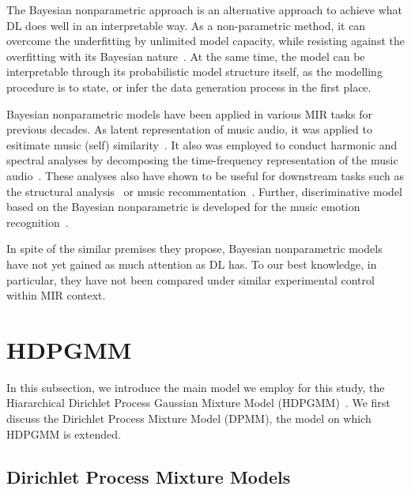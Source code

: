 \documentclass{article}
\begin{document}
The Bayesian nonparametric approach is an alternative approach to achieve what DL does well in an interpretable way. As a non-parametric method, it can overcome the underfitting by unlimited model capacity, while resisting against the overfitting with its Bayesian nature~\cite{DBLP:reference/ml/Teh17}. At the same time, the model can be interpretable through its probabilistic model structure itself, as the modelling procedure is to state, or infer the data generation process in the first place.

Bayesian nonparametric models have been applied in various MIR tasks for previous decades. As latent representation of music audio, it was applied to esitimate music (self) similarity~\cite{DBLP:conf/icassp/QiPC07, DBLP:conf/ismir/HoffmanBC08}. It also was employed to conduct harmonic and spectral analyses by decomposing the time-frequency representation of the music audio~\cite{Hoffman09findinglatent, DBLP:conf/icassp/NakanoRKOS11}. These analyses also have shown to be useful for downstream tasks such as the structural analysis~\cite{DBLP:conf/icassp/NakanoOKMK12} or music recommentation~\cite{DBLP:conf/ismir/YoshiiG09}. Further, discriminative model based on the Bayesian nonparametric is developed for the music emotion recognition~\cite{DBLP:journals/taffco/WangLCCH15}.

In spite of the similar premises they propose, Bayesian nonparametric models have not yet gained as much attention as DL has. To our best knowledge, in particular, they have not been compared under similar experimental control within MIR context. 



% 

\section{HDPGMM}\label{sec:hdpgmm}

In this subsection, we introduce the main model we employ for this study, the Hiararchical Dirichlet Process Gaussian Mixture Model (HDPGMM)~\cite{DBLP:conf/ismir/HoffmanBC08, doi:10.1198/016214506000000302}. We first discuss the Dirichlet Process Mixture Model (DPMM), the model on which HDPGMM is extended.

\subsection{Dirichlet Process Mixture Models}\label{sec:hdpgmm:dpmm}
\end{document}
